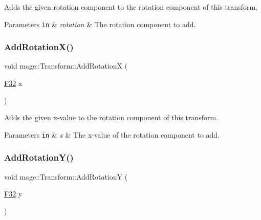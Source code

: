 Adds the given rotation component to the rotation component of this transform.


\begin{DoxyParams}[1]{Parameters}
\mbox{\tt in}  & {\em rotation} & The rotation component to add. \\
\hline
\end{DoxyParams}
\hypertarget{classmage_1_1_transform_a920bcbc350d3896bd1d8f9f6233cc008}{}\label{classmage_1_1_transform_a920bcbc350d3896bd1d8f9f6233cc008} 
\subsubsection{\texorpdfstring{Add\+Rotation\+X()}{AddRotationX()}}
{\footnotesize\ttfamily void mage\+::\+Transform\+::\+Add\+RotationX (\begin{DoxyParamCaption}\item[{\hyperlink{namespacemage_aa97e833b45f06d60a0a9c4fc22ae02c0}{F32}}]{x }\end{DoxyParamCaption})\hspace{0.3cm}{\ttfamily [noexcept]}}

Adds the given x-\/value to the rotation component of this transform.


\begin{DoxyParams}[1]{Parameters}
\mbox{\tt in}  & {\em x} & The x-\/value of the rotation component to add. \\
\hline
\end{DoxyParams}
\hypertarget{classmage_1_1_transform_ab9e20e922cd6e651a984480aa0aa6752}{}\label{classmage_1_1_transform_ab9e20e922cd6e651a984480aa0aa6752} 
\subsubsection{\texorpdfstring{Add\+Rotation\+Y()}{AddRotationY()}}
{\footnotesize\ttfamily void mage\+::\+Transform\+::\+Add\+RotationY (\begin{DoxyParamCaption}\item[{\hyperlink{namespacemage_aa97e833b45f06d60a0a9c4fc22ae02c0}{F32}}]{y }\end{DoxyParamCaption})\hspace{0.3cm}{\ttfamily [noexcept]}}


